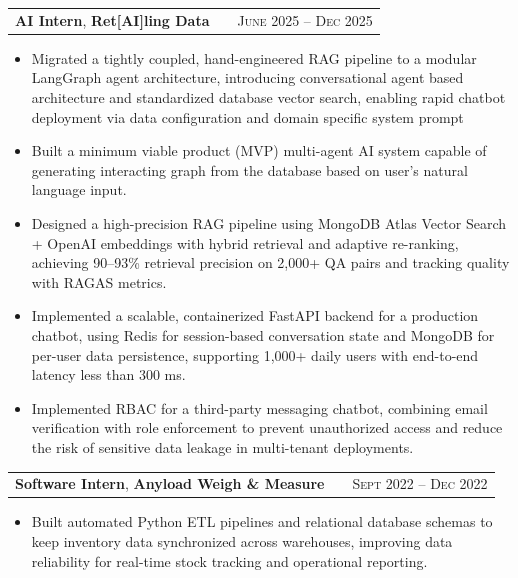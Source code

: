 \documentclass[10pt, letterpaper]{article}
\begin{document}
\begin{tabularx}{\linewidth}{@{}l X r@{}}
    \textbf{AI Intern}, \textbf{Ret[AI]ling Data} & & \textsc{June 2025 -- Dec 2025} \\
\end{tabularx}
\begin{itemize}[leftmargin=2em, itemsep=0pt]
    \item Migrated a tightly coupled, hand-engineered RAG pipeline to a modular LangGraph agent architecture, introducing conversational agent based architecture and standardized database vector search, enabling rapid chatbot deployment via data configuration and domain specific system prompt
    \item Built a minimum viable product (MVP) multi-agent AI system capable of generating interacting graph from the database based on user's natural language input. 
    \item Designed a high-precision RAG pipeline using MongoDB Atlas Vector Search + OpenAI embeddings with hybrid retrieval and adaptive re-ranking, achieving 90–93\% retrieval precision on 2,000+ QA pairs and tracking quality with RAGAS metrics.
    \item Implemented a scalable, containerized FastAPI backend for a production chatbot, using Redis for session-based conversation state and MongoDB for per-user data persistence, supporting 1,000+ daily users with end-to-end latency less than 300 ms.
    \item Implemented RBAC for a third-party messaging chatbot, combining email verification with role enforcement to prevent unauthorized access and reduce the risk of sensitive data leakage in multi-tenant deployments.
\end{itemize}

\begin{tabularx}{\linewidth}{@{}l X r@{}}
    \textbf{Software Intern}, \textbf{Anyload Weigh \& Measure} & & \textsc{Sept 2022 -- Dec 2022} \\
\end{tabularx}
\begin{itemize}[leftmargin=2em, itemsep=0pt]
    \item Built automated Python ETL pipelines and relational database schemas to keep inventory data synchronized across warehouses, improving data reliability for real-time stock tracking and operational reporting.
\end{itemize}


\end{document}

